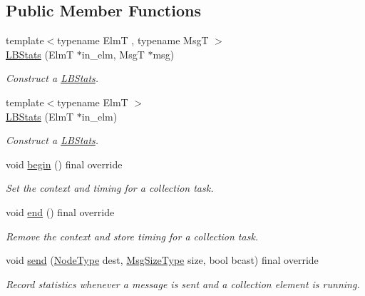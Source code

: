 \subsection*{Public Member Functions}
\begin{DoxyCompactItemize}
\item 
{\footnotesize template$<$typename ElmT , typename MsgT $>$ }\\\hyperlink{structvt_1_1ctx_1_1_l_b_stats_aa1212c9a206b738a146981acbc48327d}{L\+B\+Stats} (ElmT $\ast$in\+\_\+elm, MsgT $\ast$msg)
\begin{DoxyCompactList}\small\item\em Construct a {\ttfamily \hyperlink{structvt_1_1ctx_1_1_l_b_stats}{L\+B\+Stats}}. \end{DoxyCompactList}\item 
{\footnotesize template$<$typename ElmT $>$ }\\\hyperlink{structvt_1_1ctx_1_1_l_b_stats_a0edb70e03179a7edaab01cab7ff338f5}{L\+B\+Stats} (ElmT $\ast$in\+\_\+elm)
\begin{DoxyCompactList}\small\item\em Construct a {\ttfamily \hyperlink{structvt_1_1ctx_1_1_l_b_stats}{L\+B\+Stats}}. \end{DoxyCompactList}\item 
void \hyperlink{structvt_1_1ctx_1_1_l_b_stats_a209aad8645b7e7a4328b71c29f935da4}{begin} () final override
\begin{DoxyCompactList}\small\item\em Set the context and timing for a collection task. \end{DoxyCompactList}\item 
void \hyperlink{structvt_1_1ctx_1_1_l_b_stats_a55efc4d1d6eb579943b5b39d2a823328}{end} () final override
\begin{DoxyCompactList}\small\item\em Remove the context and store timing for a collection task. \end{DoxyCompactList}\item 
void \hyperlink{structvt_1_1ctx_1_1_l_b_stats_af8d33aaf1858c87072cfbc19c5d649a8}{send} (\hyperlink{namespacevt_a866da9d0efc19c0a1ce79e9e492f47e2}{Node\+Type} dest, \hyperlink{namespacevt_a408e86a8c7c89309b52907dc5a513924}{Msg\+Size\+Type} size, bool bcast) final override
\begin{DoxyCompactList}\small\item\em Record statistics whenever a message is sent and a collection element is running. \end{DoxyCompactList}\item 

\end{DoxyCompactItemize}
